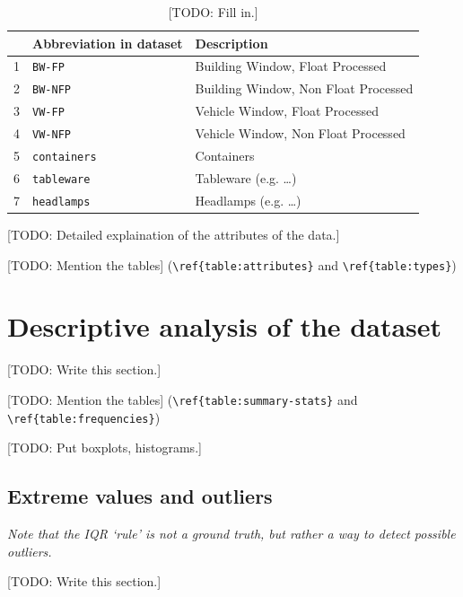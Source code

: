 \documentclass[dtu]{dtuarticle}
\newcommand{\todo}[1]{\color{red}[TODO: #1]\color{black}}
\begin{document}
	\begin{table}
		\centering
		\begin{tabular}{r|l|l}
			\textbf{} & \textbf{Abbreviation in dataset} & \textbf{Description}                 \\ \hline\hline
			1 & \texttt{BW-FP}                   & Building Window, Float Processed     \\ \hline
			2 & \texttt{BW-NFP}                  & Building Window, Non Float Processed \\ \hline
			3 & \texttt{VW-FP}                   & Vehicle Window, Float Processed      \\ \hline
			4 & \texttt{VW-NFP}                  & Vehicle Window, Non Float Processed  \\ \hline
			5 & \texttt{containers}              & Containers                           \\ \hline
			6 & \texttt{tableware}               & Tableware (e.g. \dots)               \\ \hline
			7 & \texttt{headlamps}               & Headlamps (e.g. \dots)
		\end{tabular}
		\caption{\todo{Fill in.}}
		\label{table:types}
	\end{table}

	\todo{Detailed explaination of the attributes of the data.}

	\todo{Mention the tables} (\verb*|\ref{table:attributes}| and \verb*|\ref{table:types}|)

	\section{Descriptive analysis of the dataset}

	\todo{Write this section.}

	\todo{Mention the tables} (\verb*|\ref{table:summary-stats}| and \verb*|\ref{table:frequencies}|)

	\todo{Put boxplots, histograms.}

	\subsection{Extreme values and outliers}

	\textit{Note that the IQR `rule' is not a ground truth, but rather a way to detect \textit{possible} outliers.}

	\todo{Write this section.}
\end{document}

